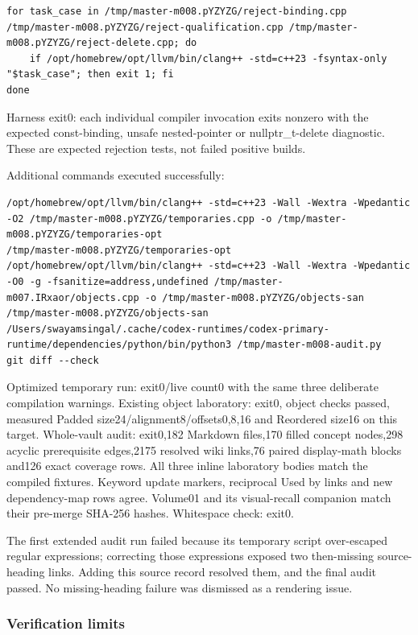 \begin{verbatim}
for task_case in /tmp/master-m008.pYZYZG/reject-binding.cpp /tmp/master-m008.pYZYZG/reject-qualification.cpp /tmp/master-m008.pYZYZG/reject-delete.cpp; do
    if /opt/homebrew/opt/llvm/bin/clang++ -std=c++23 -fsyntax-only "$task_case"; then exit 1; fi
done
\end{verbatim}

Harness exit0: each individual compiler invocation exits nonzero with the expected const-binding, unsafe nested-pointer or nullptr\_t-delete diagnostic. These are expected rejection tests, not failed positive builds.

Additional commands executed successfully:

\begin{verbatim}
/opt/homebrew/opt/llvm/bin/clang++ -std=c++23 -Wall -Wextra -Wpedantic -O2 /tmp/master-m008.pYZYZG/temporaries.cpp -o /tmp/master-m008.pYZYZG/temporaries-opt
/tmp/master-m008.pYZYZG/temporaries-opt
/opt/homebrew/opt/llvm/bin/clang++ -std=c++23 -Wall -Wextra -Wpedantic -O0 -g -fsanitize=address,undefined /tmp/master-m007.IRxaor/objects.cpp -o /tmp/master-m008.pYZYZG/objects-san
/tmp/master-m008.pYZYZG/objects-san
/Users/swayamsingal/.cache/codex-runtimes/codex-primary-runtime/dependencies/python/bin/python3 /tmp/master-m008-audit.py
git diff --check
\end{verbatim}

Optimized temporary run: exit0/live count0 with the same three deliberate compilation warnings. Existing object laboratory: exit0, object checks passed, measured Padded size24/alignment8/offsets0,8,16 and Reordered size16 on this target. Whole-vault audit: exit0,182 Markdown files,170 filled concept nodes,298 acyclic prerequisite edges,2175 resolved wiki links,76 paired display-math blocks and126 exact coverage rows. All three inline laboratory bodies match the compiled fixtures. Keyword update markers, reciprocal Used by links and new dependency-map rows agree. Volume01 and its visual-recall companion match their pre-merge SHA-256 hashes. Whitespace check: exit0.

The first extended audit run failed because its temporary script over-escaped regular expressions; correcting those expressions exposed two then-missing source-heading links. Adding this source record resolved them, and the final audit passed. No missing-heading failure was dismissed as a rendering issue.

\subsubsection{Verification limits}\label{appendix-a103e7846d21-verification-limits}

